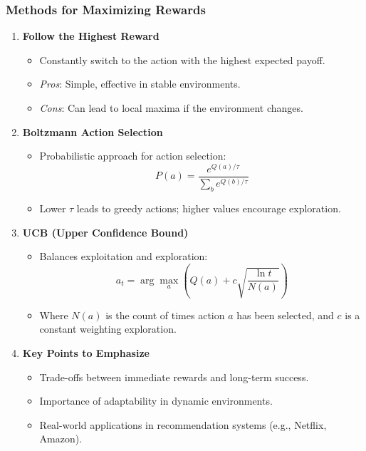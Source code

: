 \documentclass[aspectratio=169]{beamer}
\begin{document}
\begin{frame}[fragile]
    \frametitle{Methods for Maximizing Rewards}
    \begin{enumerate}
        \item \textbf{Follow the Highest Reward}
        \begin{itemize}
            \item Constantly switch to the action with the highest expected payoff.
            \item \textit{Pros}: Simple, effective in stable environments.
            \item \textit{Cons}: Can lead to local maxima if the environment changes.
        \end{itemize}
        
        \item \textbf{Boltzmann Action Selection}
        \begin{itemize}
            \item Probabilistic approach for action selection:
            \begin{equation}
                P(a) = \frac{e^{Q(a)/\tau}}{\sum_{b} e^{Q(b)/\tau}}
            \end{equation}
            \item Lower \(\tau\) leads to greedy actions; higher values encourage exploration.
        \end{itemize}
        
        \item \textbf{UCB (Upper Confidence Bound)}
        \begin{itemize}
            \item Balances exploitation and exploration:
            \begin{equation}
                a_t = \arg\max_a \left( Q(a) + c \sqrt{\frac{\ln t}{N(a)}} \right)
            \end{equation}
            \item Where \(N(a)\) is the count of times action \(a\) has been selected, and \(c\) is a constant weighting exploration.
        \end{itemize}
        
        \item \textbf{Key Points to Emphasize}
        \begin{itemize}
            \item Trade-offs between immediate rewards and long-term success.
            \item Importance of adaptability in dynamic environments.
            \item Real-world applications in recommendation systems (e.g., Netflix, Amazon).
        \end{itemize}
    \end{enumerate}
\end{frame}
\end{document}
